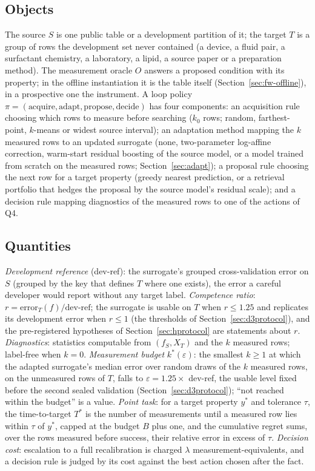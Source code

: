 \documentclass[11pt,a4paper]{article}
\begin{document}
\subsection{Objects}
\label{sec:fw-objects}
The source $S$ is one public table or a development partition of it; the
target $T$ is a group of rows the development set never contained (a device,
a fluid pair, a surfactant chemistry, a laboratory, a lipid, a source paper or
a preparation method). The measurement oracle $O$ answers a proposed condition
with its property; in the offline instantiation it is the table itself
(Section~\ref{sec:fw-offline}), in a prospective one the instrument. A loop
policy $\pi = (\text{acquire}, \text{adapt}, \text{propose}, \text{decide})$
has four components: an acquisition rule choosing which rows to measure before
searching ($k_0$ rows; random, farthest-point, $k$-means or widest source
interval); an adaptation method mapping the $k$ measured rows to an updated
surrogate (none, two-parameter log-affine correction, warm-start residual
boosting of the source model, or a model trained from scratch on the measured
rows; Section~\ref{sec:adapt}); a proposal rule choosing the next row for a
target property (greedy nearest prediction, or a retrieval portfolio that
hedges the proposal by the source model's residual scale); and a decision
rule mapping diagnostics of the measured rows to one of the actions of Q4.

\subsection{Quantities}
\label{sec:fw-quantities}
\emph{Development reference} (dev-ref): the surrogate's grouped
cross-validation error on $S$ (grouped by the key that defines $T$ where one
exists), the error a careful developer would report without any target label.
\emph{Competence ratio}: $r = \mathrm{error}_T(f)/\text{dev-ref}$; the
surrogate is usable on $T$ when $r \le 1.25$ and replicates its development
error when $r \le 1$ (the thresholds of Section~\ref{sec:d3protocol}), and the pre-registered
hypotheses of Section~\ref{sec:hprotocol} are statements about $r$.
\emph{Diagnostics}: statistics computable from $(f_S, X_T)$ and the $k$
measured rows; label-free when $k=0$. \emph{Measurement budget}
$k^{*}(\varepsilon)$: the smallest $k \ge 1$ at which the adapted surrogate's median
error over random draws of the $k$ measured rows, on the unmeasured rows of
$T$, falls to $\varepsilon = 1.25 \times$ dev-ref, the
usable level fixed before the second sealed validation
(Section~\ref{sec:d3protocol}); ``not reached within the budget'' is a value.
\emph{Point task}: for a target property $y^{*}$ and tolerance $\tau$, the
time-to-target $T^{*}$ is the number of measurements until a measured row
lies within $\tau$ of $y^{*}$, capped at the budget $B$ plus one, and the
cumulative regret sums, over the rows measured before success, their relative
error in excess of $\tau$. \emph{Decision cost}: escalation to a full recalibration is charged
$\lambda$ measurement-equivalents, and a decision rule is judged by its cost
against the best action chosen after the fact.
\end{document}
